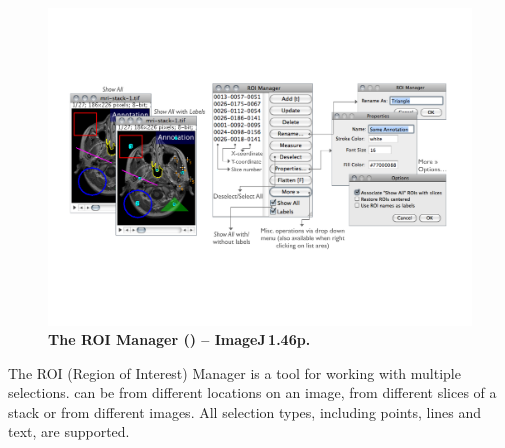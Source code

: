 

\subsubsection[\protect\userinterface{ROI Manager\ldots{}}]{\protect{}\label{sub:ROI-Manager...}\improvement{}}

\begin{figure}[h]
\noindent \includegraphics[width=1\columnwidth]{images/ROIManager}

\noindent \caption[ROI Manager]{\textbf{\label{fig:The-ROI-Manager}The ROI Manager (\protect{})
-- ImageJ\,1.46p.}}
\end{figure}
The ROI (Region of Interest) Manager
is a tool for working with multiple selections. 
can be from different locations on an image, from different slices
of a stack or from different images. All selection types, including
points, lines and text, are supported.
